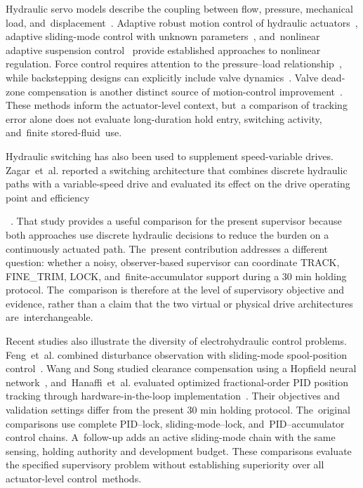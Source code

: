 \documentclass[machines,article,submit,pdftex,moreauthors]{Definitions/mdpi}
\begin{document}
Hydraulic servo models describe the coupling between flow, pressure, mechanical load, and~displacement~\cite{jelali2003}. Adaptive robust motion control of hydraulic actuators~\cite{yao2000}, adaptive sliding-mode control with unknown parameters~\cite{guan2008}, and~nonlinear adaptive suspension control~\cite{alleyne1995} provide established approaches to nonlinear regulation. Force control requires attention to the pressure--load relationship~\cite{alleyne2000}, while backstepping designs can explicitly include valve dynamics~\cite{choux2010}. Valve dead-zone compensation is another distinct source of motion-control improvement~\cite{deng2017}. These methods inform the actuator-level context, but~a comparison of tracking error alone does not evaluate long-duration hold entry, switching activity, and~finite stored-fluid~use.

Hydraulic switching has also been used to supplement speed-variable drives. Zagar~et~al. reported a switching architecture that combines discrete hydraulic paths with a variable-speed drive and evaluated its effect on the drive operating point and efficiency

~\cite{zagar2020}. That study provides a useful comparison for the present supervisor because both approaches use discrete hydraulic decisions to reduce the burden on a continuously actuated path. The~present contribution addresses a different question: whether a noisy, observer-based supervisor can coordinate TRACK, FINE\_TRIM, LOCK, and~finite-accumulator support during a 30 min holding protocol. The~comparison is therefore at the level of supervisory objective and evidence, rather than a claim that the two virtual or physical drive architectures are~interchangeable.

Recent studies also illustrate the diversity of electrohydraulic control problems. Feng~et~al. combined disturbance observation with sliding-mode spool-position control~\cite{feng2025}. Wang and Song studied clearance compensation using a Hopfield neural network~\cite{wang2024}, and~Hanaffi~et~al. evaluated optimized fractional-order PID position tracking through hardware-in-the-loop implementation~\cite{hanaffi2026}. Their objectives and validation settings differ from the present 30 min holding protocol. The~original comparisons use complete PID--lock, sliding-mode--lock, and~PID--accumulator control chains. A~follow-up adds an active sliding-mode chain with the same sensing, holding authority and development budget. These comparisons evaluate the specified supervisory problem without establishing superiority over all actuator-level control~methods.
\end{document}
